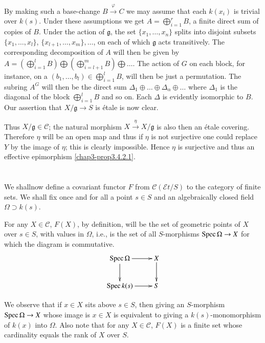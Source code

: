 By making such a base-change $B\xrightarrow{\varphi}C$ we may assume
that each $k(x_{i})$ is trivial over $k(s)$. Under these assumptions
we get $A=\bigoplus\limits^{r}_{i=1}B$, a finite direct sum of copies
of $B$. Under the action of $\mathfrak{g}$, the set
$\{x_{1},\ldots,x_{n}\}$ splits into disjoint subsets
$\{x_{1},\ldots,x_{l}\}$, $\{x_{l+1},\ldots,x_{m}\},\ldots$, on each
of which $\mathfrak{g}$ acts transitively. The corresponding
decomposition of $A$ will then be given by
$A=(\bigoplus\limits^{l}_{i=1}B)\bigoplus
(\bigoplus\limits^{m}_{i=l+1}B)\bigoplus\ldots$. The action of $G$ on
each block, for instance, on a $(b_{1},\ldots,b_{l})\in
\bigoplus\limits^{l}_{i=1}B$, will then be just a permutation. The
subring $A^{G}$ will then be the direct sum
$\Delta_{1}\oplus\ldots\oplus \Delta_{\alpha}\oplus\ldots$ where
$\Delta_{1}$ is the diagonal of the block
$\bigoplus\limits^{l}_{i=1}B$ and so on. Each $\Delta$ is evidently
isomorphic to $B$. Our assertion that $X/\mathfrak{g}\to S$ is \'etale
is now clear.

Thus $X/\mathfrak{g}\in\mathscr{C}$; the natural morphism
$X\xrightarrow{\eta}X/\mathfrak{g}$ is also then an \'etale
covering. Therefore $\eta$ will be an open map and thus if $\eta$ is
not surjective one could replace $Y$ by the image of $\eta$; this is
clearly impossible. Hence $\eta$ is surjective and thus an effective
epimorphism \ref{chap3-prop3.4.2.1}.

\section{}\label{chap4-sec4.2}

We shall\pageoriginale now define a covariant functor $F$ from
$\mathscr{C}(\mathscr{E}t/S)$ to the category of finite sets. We shall
fix once and for all a point $s\in S$ and an algebraically closed
field $\Omega\supset k(s)$.

For any $X\in\mathscr{C}$, $F(X)$, by definition, will be the set of
geometric points of $X$ over $s\in S$, with values in $\Omega$, i.e.,
is the set of all $S$-morphisms $\operatorname{Spec} \Omega\to X$ for which the
diagram is commutative.
\[
\xymatrix{
\Spec \Omega\ar[r]\ar[d] & X\ar[d]\\
\Spec k(s)\ar[r] & S
}
\] 

We observe that if $x\in X$ sits above $s\in S$, then giving an
$S$-morphism $\operatorname{Spec} \Omega\to X$ whose image is $x\in X$ is equivalent
to giving a $k(s)$-monomorphism of $k(x)$ into $\Omega$. Also note
that for any $X\in \mathscr{C}$, $F(X)$ is a finite set whose
cardinality equals the rank of $X$ over $S$.

